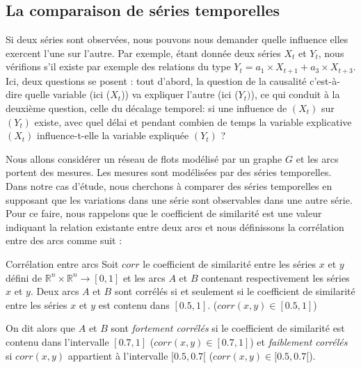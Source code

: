 \subsection{La comparaison de  s\'eries temporelles}
Si deux s\'eries sont observ\'ees, nous pouvons nous demander quelle influence elles exercent l'une sur l'autre. 
Par exemple, \'etant donn\'ee deux s\'eries $X_t$ et $Y_t$, nous v\'erifions s'il existe par exemple des relations du type
$Y_t = a_1 \times X_{t+1} + a_3 \times X_{t+3}. $
\newline
Ici, deux questions se posent : tout d'abord, la question de la causalit\'e c'est-\`a-dire quelle variable (ici ($X_t$)) va expliquer l'autre (ici ($Y_t)$), ce qui conduit \`a la deuxi\`eme question, celle du d\'ecalage temporel: si une influence de $(X_t)$ sur $(Y_t)$ existe, avec quel d\'elai et pendant combien de temps la variable explicative $(X_t)$ influence-t-elle la variable expliqu\'ee $(Y_t)$ ?
\newline

Nous allons consid\'erer un r\'eseau de flots mod\'elis\'e par un graphe $G$ et les arcs portent des mesures. Les mesures sont mod\'elis\'ees par des s\'eries temporelles.
Dans notre cas d'\'etude, nous cherchons \`a comparer des s\'eries temporelles en supposant que les variations dans une s\'erie sont observables dans une autre s\'erie. Pour ce faire, nous rappelons que le coefficient de similarit\'e est une valeur indiquant la relation existante entre deux arcs et nous d\'efinissons la corr\'elation entre des arcs comme suit : 

\begin{definition}  Corr\'elation entre arcs\newline
Soit $corr$ le coefficient de similarit\'e entre les s\'eries $x$ et $y$ d\'efini de $\mathbb{R}^{n} \times \mathbb{R}^{n}
 \rightarrow [0,1]$ et 
 les arcs $A$ et $B$ contenant respectivement les s\'eries $x$ et $y$.
 \newline
Deux arcs $A$ et $B$ sont corr\'el\'es si et seulement si le coefficient de similarit\'e entre les s\'eries $x$ et $y$ est contenu dans $[0.5,1]$. 
($corr(x, y) \in [0.5,1]$)
\end{definition}
On dit alors que  $A$ et $B$ sont {\em fortement  corr\'el\'es} si 
le coefficient de similarit\'e est contenu dans l'intervalle $[0.7, 1]$ ($corr(x, y) \in [0.7,1]$) et {\em faiblement corr\'el\'es} si $corr(x, y)$ appartient \`a l'intervalle $[0.5,0.7[$ ($corr(x,y) \in [0.5, 0.7[$).
\newline

